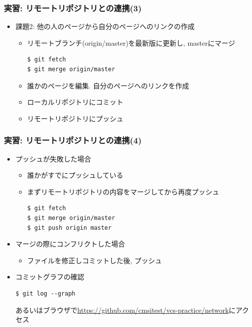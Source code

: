 \begin{frame}[t,fragile]
  \frametitle{実習: リモートリポジトリとの連携(3)}
  \begin{itemize}
  \item 課題2: 他の人のページから自分のページへのリンクの作成
    \begin{itemize}
      \item リモートブランチ(origin/master)を最新版に更新し, masterにマージ
\begin{lstlisting}
$ git fetch
$ git merge origin/master
\end{lstlisting}
      \item 誰かのページを編集. 自分のページヘのリンクを作成
      \item ローカルリポジトリにコミット
      \item リモートリポジトリにプッシュ
    \end{itemize}
  \end{itemize}
\end{frame}

\begin{frame}[t,fragile]
  \frametitle{実習: リモートリポジトリとの連携(4)}
  \begin{itemize}
  \item プッシュが失敗した場合
    \begin{itemize}
      \item 誰かがすでにプッシュしている
      \item まずリモートリポジトリの内容をマージしてから再度プッシュ
\begin{lstlisting}
$ git fetch
$ git merge origin/master
$ git push origin master
\end{lstlisting}
    \end{itemize}
  \item マージの際にコンフリクトした場合
    \begin{itemize}
      \item ファイルを修正しコミットした後, プッシュ
    \end{itemize}
  \item コミットグラフの確認
\begin{lstlisting}
$ git log --graph
\end{lstlisting}
    あるいはブラウザで\url{https://github.com/cmsitest/vcs-practice/network}にアクセス
  \end{itemize}
\end{frame}

